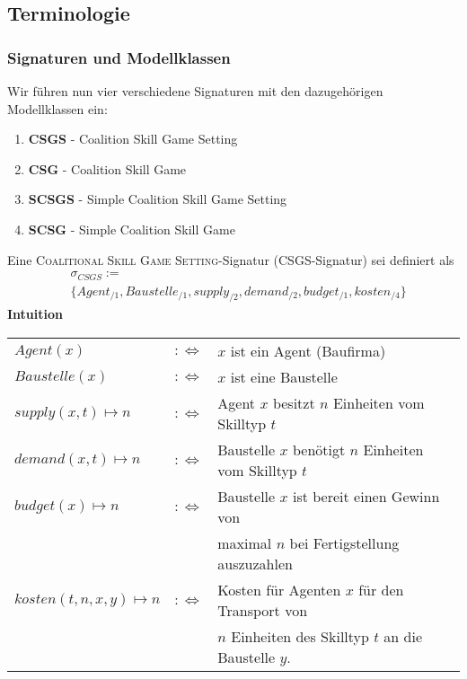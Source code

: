 \documentclass[sigconf]{acmart}
\theoremstyle{break}
\begin{document}
\subsection{Terminologie}
\label{sigmod}

\subsubsection{Signaturen und Modellklassen}
Wir führen nun vier verschiedene Signaturen mit den dazugehörigen Modellklassen ein:
\begin{enumerate}
  \item \textbf{CSGS} - Coalition Skill Game Setting
  \item \textbf{CSG} - Coalition Skill Game
  \item \textbf{SCSGS} - Simple Coalition Skill Game Setting
  \item \textbf{SCSG} - Simple Coalition Skill Game
\end{enumerate}

\begin{definition}[CSGS]
  Eine \textsc{Coalitional Skill Game Setting}-Signatur (CSGS-Signatur) sei definiert als
  \begin{align*}
    &\sigma_{CSGS}:= \\
    &\{Agent_{/1}, Baustelle_{/1}, supply_{/2}, demand_{/2}, budget_{/1}, kosten_{/4} \}
  \end{align*}
  \noindent
  \textbf{Intuition} \\
    \begin{tabular}{lrl}
    $Agent(x)$&$:\Leftrightarrow$& $x$ ist ein Agent (Baufirma) \\
    $Baustelle(x) $&$:\Leftrightarrow$& $x$ ist eine Baustelle \\
    $supply(x, t)\mapsto n $&$:\Leftrightarrow$& Agent $x$ besitzt $n$ Einheiten vom Skilltyp $t$ \\
    $demand(x, t)\mapsto n $&$:\Leftrightarrow$& Baustelle $x$ benötigt $n$ Einheiten vom Skilltyp $t$ \\
    $budget(x)\mapsto n $&$:\Leftrightarrow$&
    Baustelle $x$ ist bereit einen Gewinn von \\&&maximal $n$ bei Fertigstellung auszuzahlen\\
    $kosten(t, n, x, y)\mapsto n$&$:\Leftrightarrow$& Kosten für Agenten $x$ für den Transport von \\&&$n$ Einheiten des Skilltyp $t$ an die Baustelle $y$.
    \end{tabular}
\end{definition}
\end{document}

